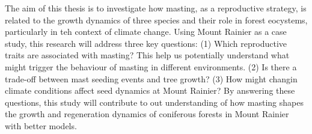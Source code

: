 \documentclass[11pt,letter]{article}
\begin{document}
The aim of this thesis is to investigate how masting, as a reproductive strategy, is related to the growth dynamics of three species and their role in forest eocystems, particularly in teh context of climate change. Using Mount Rainier as a case study, this research will address three key questions: (1) Which reproductive traits are associated with masting? This help us potentially understand what might trigger the behaviour of masting in different environments. (2) Is there a trade-off between mast seeding events and tree growth? (3) How might changin climate conditions affect seed dynamics at Mount Rainier? By answering these questions, this study will contribute to out understanding of how masting shapes the growth and regeneration dynamics of coniferous forests in  Mount Rainier with better models.\par
\end{document}
